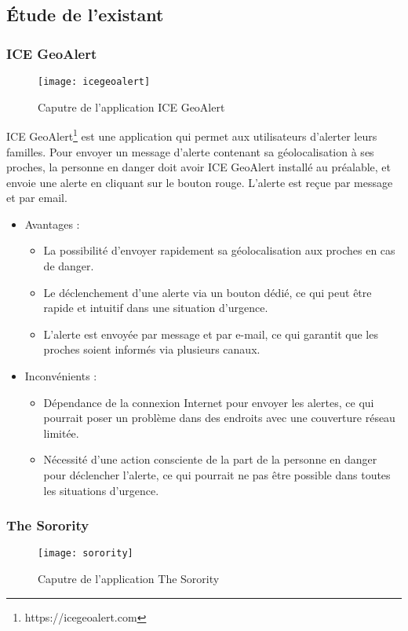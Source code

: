 \subsection{Étude de l’existant}
\subsubsection{ICE GeoAlert}
\begin{figure}[H]
	\centering
	\texttt{[image: icegeoalert]}
	\caption{Caputre de l’application ICE GeoAlert}
\end{figure}

ICE GeoAlert\footnote{https://icegeoalert.com} est une application qui permet aux utilisateurs d’alerter leurs familles. Pour envoyer un message d’alerte contenant sa géolocalisation à ses proches, la personne en danger doit avoir ICE GeoAlert installé au préalable, et envoie une alerte en cliquant sur le bouton rouge. L’alerte est reçue par message et par email.

\begin{itemize}
	\item Avantages :
	\begin{itemize}
		\item La possibilité d'envoyer rapidement sa géolocalisation aux proches en cas de danger.
		\item Le déclenchement d'une alerte via un bouton dédié, ce qui peut être rapide et intuitif dans une situation d'urgence.
		\item L'alerte est envoyée par message et par e-mail, ce qui garantit que les proches soient informés via plusieurs canaux.
	\end{itemize}
	
	\item Inconvénients :
	\begin{itemize}
		\item Dépendance de la connexion Internet pour envoyer les alertes, ce qui pourrait poser un problème dans des endroits avec une couverture réseau limitée.
		
		\item Nécessité d'une action consciente de la part de la personne en danger pour déclencher l'alerte, ce qui pourrait ne pas être possible dans toutes les situations d'urgence.
	\end{itemize}
	
\end{itemize}

\subsubsection{The Sorority}
\begin{figure}[H]
	\centering
	\texttt{[image: sorority]}
	\caption{Caputre de l’application The Sorority}
\end{figure}

